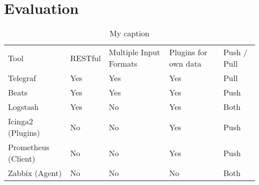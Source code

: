 \chapter{Evaluation} %
\begin{table}[]
\centering
\caption{My caption}
\label{my-label}
\begin{tabular}{lllll}
\cellcolor[HTML]{FFFFFF}Tool & RESTful                     & Multiple Input Formats      & Plugins for own data        & Push / Pull                  \\
Telegraf                     & \cellcolor[HTML]{FFFFFF}Yes & Yes                         & Yes                         & Pull                         \\
Beats                        & Yes                         & \cellcolor[HTML]{FFFFFF}Yes & Yes                         & Push                         \\
Logstash                     & Yes                         & No                          & \cellcolor[HTML]{FFFFFF}Yes & Both                         \\
Icinga2 (Plugins)            & No                          & No                          & Yes                         & \cellcolor[HTML]{FFFFFF}Push \\
Prometheus (Client)          & No                          & No                          & Yes                         & \cellcolor[HTML]{FFFFFF}Push \\
Zabbix (Agent)               & No                          & No                          & \cellcolor[HTML]{FFFFFF}No  & Both                        
\end{tabular}
\end{table}

\\

